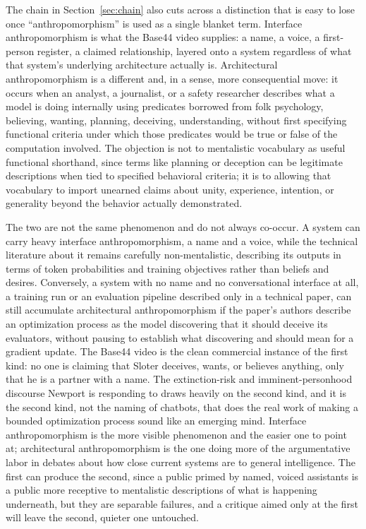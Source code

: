 \documentclass[11pt]{article}
\begin{document}
The chain in Section~\ref{sec:chain} also cuts across a distinction that is easy to lose once ``anthropomorphism'' is used as a single blanket term. Interface anthropomorphism is what the Base44 video supplies: a name, a voice, a first-person register, a claimed relationship, layered onto a system regardless of what that system's underlying architecture actually is. Architectural anthropomorphism is a different and, in a sense, more consequential move: it occurs when an analyst, a journalist, or a safety researcher describes what a model is doing internally using predicates borrowed from folk psychology, believing, wanting, planning, deceiving, understanding, without first specifying functional criteria under which those predicates would be true or false of the computation involved. The objection is not to mentalistic vocabulary as useful functional shorthand, since terms like planning or deception can be legitimate descriptions when tied to specified behavioral criteria; it is to allowing that vocabulary to import unearned claims about unity, experience, intention, or generality beyond the behavior actually demonstrated.

The two are not the same phenomenon and do not always co-occur. A system can carry heavy interface anthropomorphism, a name and a voice, while the technical literature about it remains carefully non-mentalistic, describing its outputs in terms of token probabilities and training objectives rather than beliefs and desires. Conversely, a system with no name and no conversational interface at all, a training run or an evaluation pipeline described only in a technical paper, can still accumulate architectural anthropomorphism if the paper's authors describe an optimization process as the model discovering that it should deceive its evaluators, without pausing to establish what discovering and should mean for a gradient update. The Base44 video is the clean commercial instance of the first kind: no one is claiming that Sloter deceives, wants, or believes anything, only that he is a partner with a name. The extinction-risk and imminent-personhood discourse Newport is responding to draws heavily on the second kind, and it is the second kind, not the naming of chatbots, that does the real work of making a bounded optimization process sound like an emerging mind. Interface anthropomorphism is the more visible phenomenon and the easier one to point at; architectural anthropomorphism is the one doing more of the argumentative labor in debates about how close current systems are to general intelligence. The first can produce the second, since a public primed by named, voiced assistants is a public more receptive to mentalistic descriptions of what is happening underneath, but they are separable failures, and a critique aimed only at the first will leave the second, quieter one untouched.
\end{document}
